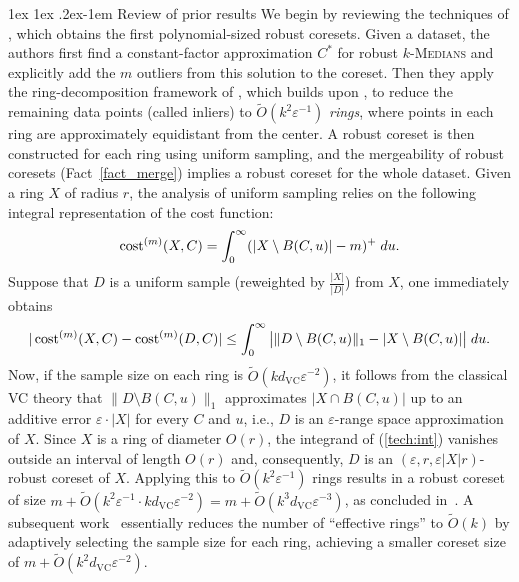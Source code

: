 \documentclass[11pt,letterpaper]{article}
\makeatletter
\renewcommand{\paragraph}{%
  \@startsection{paragraph}{4}%
  {\z@}{1ex \@plus 1ex \@minus .2ex}{-1em}%
  {\normalfont\normalsize\bfseries}%
}
\theoremstyle{definition}
\newcommand{\eps}{\varepsilon}
\newcommand{\VC}{\ensuremath{\mathrm{VC}}}
\newcommand{\ProblemName}[1]{\textsc{#1}}
\newcommand{\kMedian}{\ProblemName{$k$-Medians}\xspace}
\makeatother
\begin{document}
\paragraph{Review of prior results}
We begin by reviewing the techniques of \cite{huang2022near}, which obtains the first polynomial-sized robust coresets. 
%
Given a dataset, the authors first find a constant-factor approximation $C^\ast$ for robust \kMedian and explicitly add the $m$ outliers from this solution to the coreset. 
%
Then they apply the ring-decomposition framework of \cite{braverman2022power}, which builds upon \cite{Chen09}, to reduce the remaining data points (called inliers) to $\tilde{O}(k^2\eps^{-1})$ \emph{rings}, where points in each ring are approximately equidistant from the center. 
A robust coreset is then constructed for each ring using uniform sampling, and the mergeability of robust coresets (Fact~\ref{fact_merge}) implies a robust coreset for the whole dataset. 
%
Given a ring $X$ of radius $r$, the analysis of uniform sampling relies on the following integral representation of the cost function:
\[
    \cost[m](X,C)=\int_{0}^{\infty} (|X\setminus B(C,u)|-m)^+ \; du.
\]
Suppose that $D$ is a uniform sample (reweighted by $\frac{|X|}{|D|}$) from $X$, one immediately obtains 
\begin{equation} \label{tech:int}
|\cost[m](X,C)-\cost[m](D,C)|\leq \int_{0}^{\infty} \big|\|D\setminus B(C,u)\|_1-|X\setminus B(C,u)|\big| \; du.
\end{equation} 
Now, if the sample size on each ring is $\tilde{O}(kd_{\VC}\eps^{-2})$, it follows from the classical VC theory that $\|D\setminus B(C,u)\|_1$ approximates $|X\cap B(C,u)|$ up to an additive error $\eps\cdot |X|$ for every $C$ and $u$, i.e., $D$ is an $\eps$-range space approximation of $X$. 
%
Since $X$ is a ring of diameter $O(r)$, the integrand of (\ref{tech:int}) vanishes outside an interval of length $O(r)$ and, consequently, $D$ is an $(\eps,r,\eps |X| r)$-robust coreset of $X$. 
%
Applying this to $\tilde{O}(k^2\eps^{-1})$ rings results in a robust coreset of size $m+\tilde{O}(k^2\eps^{-1}\cdot kd_{\VC}\eps^{-2}) = m+\tilde{O}(k^3d_{\VC}\eps^{-3})$, as concluded in~\cite{huang2022near}.
%
A subsequent work~\cite{huang2025coresets} essentially reduces the number of ``effective rings'' to \( \tilde{O}(k) \) by adaptively selecting the sample size for each ring, achieving a smaller coreset size of \( m + \tilde{O}(k^2 d_{\VC} \eps^{-2}) \).
\end{document}
